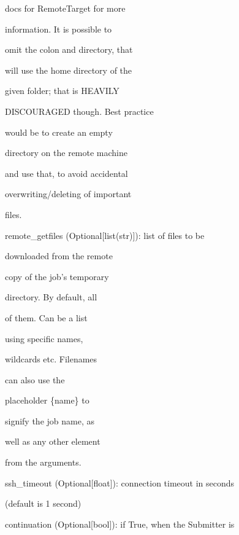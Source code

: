 \documentclass[letterpaper,10pt,english]{sphinxmanual}
\begin{document}
\begin{fulllineitems}
\begin{DUlineblock}{0em}
\begin{DUlineblock}{\DUlineblockindent}
\begin{DUlineblock}{\DUlineblockindent}
\item[] docs for RemoteTarget for more
\item[] information. It is possible to
\item[] omit the colon and directory, that
\item[] will use the home directory of the
\item[] given folder; that is HEAVILY
\item[] DISCOURAGED though. Best practice
\item[] would be to create an empty
\item[] directory on the remote machine
\item[] and use that, to avoid accidental
\item[] overwriting/deleting of important
\item[] files.
\end{DUlineblock}
\item[] remote\_getfiles (Optional{[}list(str){]}): list of files to be
\item[]
\begin{DUlineblock}{\DUlineblockindent}
\item[] downloaded from the remote
\item[] copy of the job's temporary
\item[] directory. By default, all
\item[] of them. Can be a list
\item[] using specific names,
\item[] wildcards etc. Filenames
\item[] can also use the
\item[] placeholder \{name\} to
\item[] signify the job name, as
\item[] well as any other element
\item[] from the arguments.
\end{DUlineblock}
\item[] ssh\_timeout (Optional{[}float{]}): connection timeout in seconds
\item[]
\begin{DUlineblock}{\DUlineblockindent}
\item[] (default is 1 second)
\end{DUlineblock}
\item[] continuation (Optional{[}bool{]}): if True, when the Submitter is
\item[]
\begin{DUlineblock}{\DUlineblockindent}

\end{DUlineblock}
\end{DUlineblock}
\end{DUlineblock}
\end{fulllineitems}
\end{document}
